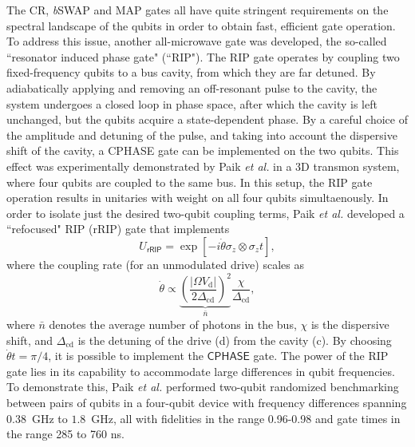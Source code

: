 \documentclass[aip,apr,twocolumn,showpacs,superscriptaddress,groupedaddress,nofootinbib,reprint]{revtex4-1}  %
\newcommand{\bSWAP}{\emph{b}\textsf{SWAP}}
\newcommand{\CPHASE}{\textsf{CPHASE}}
\newcommand{\CR}{\textsf{CR}}
\newcommand{\etal}{\emph{et al.}}
\renewcommand{\d}{\text{d}}
\begin{document}
The \CR{}, \bSWAP{} and \textsf{MAP} gates all have quite stringent requirements on the spectral landscape of the qubits in order to obtain fast, efficient gate operation. To address this issue, another all-microwave gate was developed, the so-called ``resonator induced phase gate" (``\textsf{RIP}")\cite{Cross2015,Puri2016}. The \textsf{RIP} gate operates by coupling two fixed-frequency qubits to a bus cavity, from which they are far detuned. By adiabatically applying and removing an off-resonant pulse to the cavity, the system undergoes a closed loop in phase space, after which the cavity is left unchanged, but the qubits acquire a state-dependent phase. By a careful choice of the amplitude and detuning of the pulse, and taking into account the dispersive shift of the cavity, a \CPHASE{} gate can be implemented on the two qubits. This effect was experimentally demonstrated by Paik \etal{}\cite{Paik2016} in a 3D transmon system\cite{Paik2011}, where four qubits are coupled to the same bus. In this setup, the \textsf{RIP} gate operation results in unitaries with weight on all four qubits simultaenously. In order to isolate just the desired two-qubit coupling terms, Paik \etal{}  developed a ``refocused" \textsf{RIP} (r\textsf{RIP}) gate that implements
\begin{equation}
U_\textsf{rRIP} = \exp\left[-i \dot \theta \sigma_z \otimes \sigma_z t\right],
\end{equation}
where the coupling rate (for an unmodulated drive) scales as
\begin{equation}
\dot \theta \propto \underbrace{\left(\frac{|\Omega V_\d|}{2\Delta_\text{cd}}\right)^2}_{\bar n} \frac{\chi}{\Delta_\text{cd}},
\end{equation}
where $\bar n$ denotes the average number of photons in the bus, $\chi$ is the dispersive shift, and $\Delta_\text{cd}$ is the detuning of the drive (d) from the cavity (c). By choosing $\dot \theta t = \pi/4$, it is possible to implement the $\CPHASE{}$ gate. The power of the \textsf{RIP} gate lies in its capability to accommodate large differences in qubit frequencies. To demonstrate this, Paik \etal{}\cite{Paik2016} performed two-qubit randomized benchmarking between pairs of qubits in a four-qubit device with frequency differences spanning $0.38$~GHz to $1.8$~GHz, all with fidelities in the range 0.96-0.98 and gate times in the range 285 to 760 ns.


\end{document}
